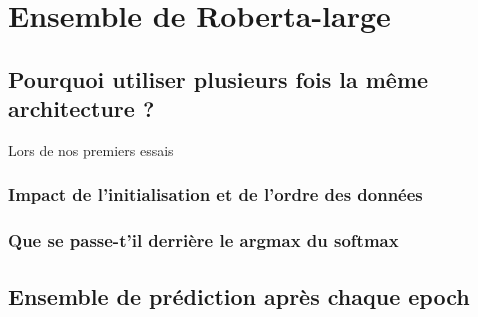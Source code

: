 \chapter{Ensemble de Roberta-large}

\section{Pourquoi utiliser plusieurs fois la même architecture ?}
Lors de nos premiers essais
\subsection{Impact de l'initialisation et de l'ordre des données}

\subsection{Que se passe-t'il derrière le argmax du softmax}

\section{Ensemble de prédiction après chaque epoch}

